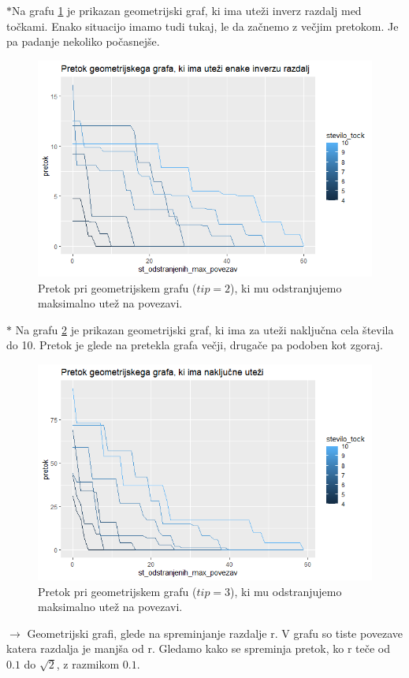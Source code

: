 \documentclass[a4paper]{article}
\begin{document}
$\ast$Na grafu \ref{fig13} je prikazan geometrijski graf, ki ima uteži inverz razdalj med točkami. Enako situacijo imamo tudi tukaj, le da začnemo z večjim pretokom. Je pa padanje nekoliko počasnejše. 
\begin{figure}[H]
\centerline{\includegraphics[scale=.5]{p7_1.PNG}}
\caption{Pretok pri geometrijskem grafu ($tip = 2$), ki mu odstranjujemo maksimalno utež na povezavi.}
\label{fig13}
\end{figure}

\newpage
$\ast$ Na grafu \ref{fig14} je prikazan geometrijski graf, ki ima za uteži naključna cela števila do 10. Pretok je glede na pretekla grafa večji, drugače pa podoben kot zgoraj.
\begin{figure}[H]
\centerline{\includegraphics[scale=.5]{p9_1.PNG}}
\caption{Pretok pri geometrijskem grafu ($tip = 3$), ki mu odstranjujemo maksimalno utež na povezavi.}
\label{fig14}
\end{figure}  
\newpage
$\rightarrow$ Geometrijski grafi, glede na spreminjanje razdalje r. V grafu so tiste povezave katera razdalja je manjša od r. Gledamo kako se spreminja pretok, ko r teče od $0.1$ do $\sqrt{2}$, z razmikom $0.1$.  \\
\end{document}
